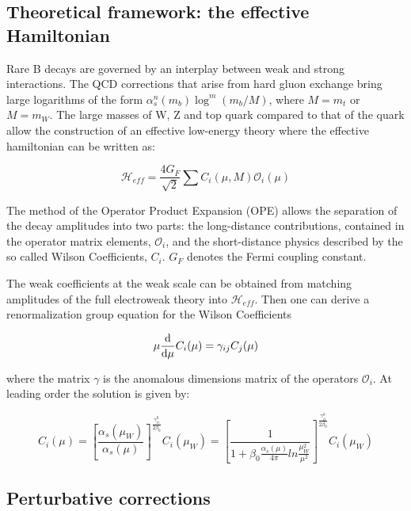 \subsection{Theoretical framework: the effective Hamiltonian}
\label{sec:Effective_Hamiltonian}

Rare B decays are governed by an interplay between weak and strong interactions.
The QCD corrections that arise from hard gluon exchange bring large logarithms
of the form $\alpha_s^n(m_b)\log^m(m_b/M)$, where $M = m_t$ or $M = m_W$.
The large masses of W, Z and top quark compared to that of the \bquark quark allow
the construction of an effective low-energy theory where the effective hamiltonian
can be written as:

\begin{equation}
\mathcal{H}_{eff} = \frac{4G_F}{\sqrt{2}} \sum C_i(\mu,M)\mathcal{O}_i(\mu)
\end{equation}

The method of the Operator Product Expansion (OPE) allows the separation
of the decay amplitudes into two parts: the long-distance contributions,
contained in the operator matrix elements, $\mathcal{O}_i$, and the short-distance physics described
by the so called Wilson Coefficients, $C_i$. $G_F$ denotes the Fermi coupling constant.

The weak coefficients at the weak scale can be obtained from matching amplitudes
of the full electroweak theory into $\mathcal{H}_{eff}$.
Then one can derive a renormalization group equation for the Wilson Coefficients

\begin{equation}
\mu \frac{\mathrm{d}}{\mathrm{d} \mu} C_i(\mu) = \gamma_{ij}C_j(\mu)
\end{equation}

where the matrix $\gamma$ is the anomalous dimensions matrix of the operators $\mathcal{O}_i$.
At leading order the solution is given by:

\begin{equation}
C_i(\mu) = \left[ \frac{\alpha_s(\mu_W)}{\alpha_s(\mu)}\right]^{\frac{\gamma^0_{ii}}{2\beta_0}} C_i(\mu_W) = \left[ \frac{1}{1 + \beta_0\frac{\alpha_s(\mu)}{4\pi}ln\frac{\mu_W^2}{\mu^2}} \right]^{\frac{\gamma^0_{ii}}{2\beta_0}} C_i(\mu_W)
\end{equation}

\subsection{Perturbative corrections}

